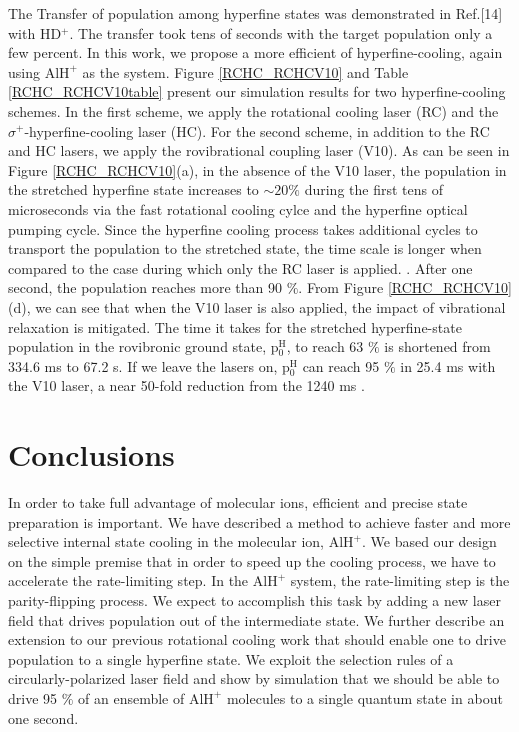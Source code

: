 \documentclass[twoside,twocolumn,9pt]{article}
\begin{document}
The Transfer of population among hyperfine states was demonstrated in Ref.[14] with HD$^{+}$. The transfer took tens of seconds with the target population only  a few percent. In this work, we propose a more efficient  of hyperfine-cooling, again using $\mathrm{AlH}^{+}$ as the system. Figure \ref{RCHC_RCHCV10} and Table \ref{RCHC_RCHCV10table} present our simulation results for two hyperfine-cooling schemes. In the first scheme, we apply the rotational cooling laser (RC) and the $\sigma^+$-hyperfine-cooling laser (HC). For the second scheme, in addition to the RC and HC lasers, we apply the rovibrational coupling laser (V10). As can be seen in Figure \ref{RCHC_RCHCV10}(a), in the absence of the V10 laser, the population in the stretched hyperfine state increases to $\sim 20 \%$ during the first tens of microseconds via the fast rotational cooling cylce and the hyperfine optical pumping cycle. Since the hyperfine cooling process takes additional cycles to transport the population to the stretched state, the time scale is longer when compared to the case during which only the RC laser is applied. . After one second, the population reaches more than 90 $\%$. From Figure \ref{RCHC_RCHCV10}(d), we can see that when the V10 laser is also applied, the impact of vibrational relaxation is mitigated. The time it takes for the stretched hyperfine-state population in the rovibronic ground state, p$_{0}^{\mathrm{H}}$, to reach 63 $\%$ is shortened from 334.6 ms to 67.2 \si{\micro}s. If we leave the lasers on, p$_{0}^{\mathrm{H}}$ can reach 95 $\%$ in 25.4 ms with the V10 laser, a near 50-fold reduction from the 1240 ms . 

\section{Conclusions}
In order to take full advantage of molecular ions, efficient and precise state preparation is important. We have described a method to achieve faster and more selective internal state cooling in the molecular ion, $\mathrm{AlH}^+$. We based our design on the simple premise that in order to speed up the cooling process, we have to accelerate the rate-limiting step. In the $\mathrm{AlH}^+$ system, the rate-limiting step is the parity-flipping process. We expect to accomplish this task by adding a new laser field that drives population out of the intermediate state. We further describe an extension to our previous rotational cooling work that should enable one to drive population to a single hyperfine state. We exploit the selection rules of a circularly-polarized laser field and show by simulation that we should be able to drive 95 $\%$ of an ensemble of $\mathrm{AlH}^+$ molecules to a single quantum state in about one second. 
\end{document}
